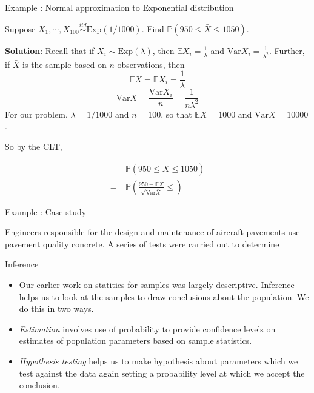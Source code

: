 \documentclass[ignorenonframetext,]{beamer}
\begin{document}
\begin{frame}{Example : Normal approximation to Exponential
distribution}

Suppose \(X_1,\cdots,X_{100} \stackrel{iid}{\sim}\text{Exp}(1/1000)\).
Find \(\mathbb{P}(950\le\bar{X}\le 1050)\).

\textbf{Solution}: Recall that if \(X_i\sim\text{Exp}(\lambda)\), then
\(\mathbb{E}X_i=\frac{1}{\lambda}\) and
\(\text{Var}X_i=\frac{1}{\lambda^2}\). Further, if \(\bar{X}\) is the
sample based on \(n\) observations, then
\[\mathbb{E}\bar{X}=\mathbb{E}X_i=\frac{1}{\lambda}\]
\[\text{Var}\bar{X}=\frac{\text{Var}X_i}{n}=\frac{1}{n\lambda^2}\] For
our problem, \(\lambda=1/1000\) and \(n=100\), so that
\(\mathbb{E}\bar{X}=1000\) and \(\text{Var}\bar{X}=10000\).

So by the CLT,

\begin{align*}
&\ \mathbb{P}(950\le\bar{X}\le 1050)\\
= &\ \mathbb{P}\left(\frac{950-\mathbb{E}\bar{X}}{\sqrt{\text{Var}\bar{X}}}\le \right)
\end{align*}

\end{frame}

\begin{frame}{Example : Case study}

Engineers responsible for the design and maintenance of aircraft
pavements use pavement quality concrete. A series of tests were carried
out to determine

\end{frame}

\begin{frame}{Inference}

\begin{itemize}
\item
  Our earlier work on statitics for samples was largely descriptive.
  Inference helps us to look at the samples to draw conclusions about
  the population. We do this in two ways.
\item
  \emph{Estimation} involves use of probability to provide confidence
  levels on estimates of population parameters based on sample
  statistics.
\item
  \emph{Hypothesis testing} helps us to make hypothesis about parameters
  which we test against the data again setting a probability level at
  which we accept the conclusion.
\end{itemize}

\end{frame}
\end{document}
